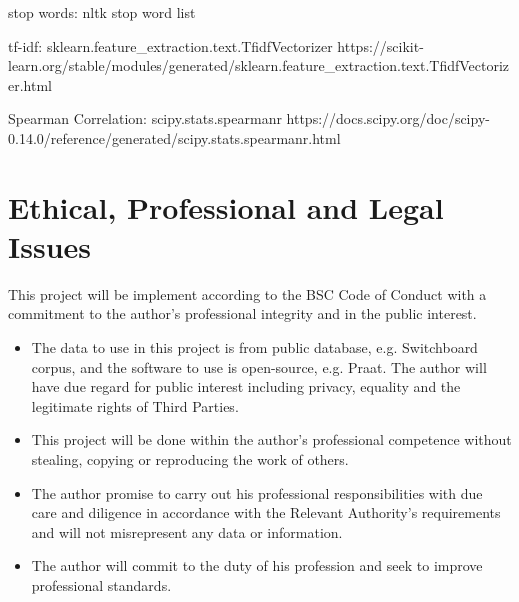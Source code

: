 stop words: nltk stop word list


tf-idf: sklearn.feature_extraction.text.TfidfVectorizer
https://scikit-learn.org/stable/modules/generated/sklearn.feature_extraction.text.TfidfVectorizer.html

Spearman Correlation: scipy.stats.spearmanr
https://docs.scipy.org/doc/scipy-0.14.0/reference/generated/scipy.stats.spearmanr.html




\section{Ethical, Professional and Legal Issues}
This project will be implement according to the BSC Code of Conduct with a commitment to the author's professional integrity and in the public interest.

\begin{itemize}
	
	\item The data to use in this project is from public database, e.g. Switchboard corpus, and the software to use is open-source, e.g. Praat. The author will have due regard for public interest including privacy, equality and  the legitimate rights of Third Parties.
	
	\item This project will be done within the author's professional competence without stealing, copying or reproducing the work of others.
	
	\item The author promise to carry out his professional responsibilities with due care and
	diligence in accordance with the Relevant Authority’s requirements and will not misrepresent any data or information.
	
	\item The author will commit to the duty of his profession and seek to improve professional standards.
\end{itemize}



